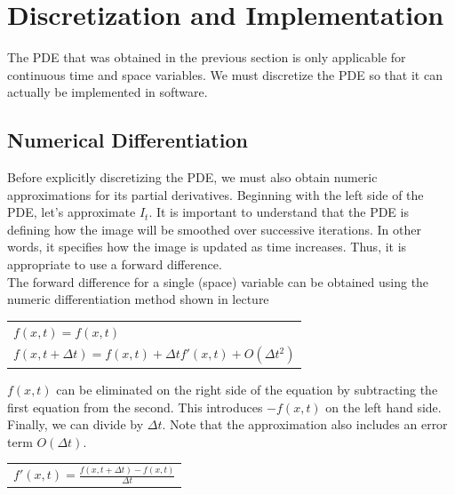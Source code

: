 \documentclass{article}
\begin{document}
  \newpage
  \section{Discretization and Implementation}
  \noindent
  The PDE that was obtained in the previous section is only applicable for continuous
  time and space variables. We must discretize the PDE so that it can actually be implemented in software.\\

  \subsection{Numerical Differentiation}
  \noindent
  Before explicitly discretizing the PDE, we must also obtain numeric approximations for its partial
  derivatives. Beginning with the left side of the PDE, let's approximate $I_{t}$. 
  It is important to understand that the PDE is defining how the image will be smoothed
  over successive iterations. In other words, it specifies how the image is updated as time increases.
  Thus, it is appropriate to use a forward difference.\\

  \noindent
  The forward difference for a single (space) variable can be obtained using the 
  numeric differentiation method shown in lecture
  \begin{center}
    \begin{tabular}{l}
      \vspace{12pt}
      $f(x,t) = f(x,t)$\\
      $f(x,t+\Delta t) = f(x,t) + \Delta t f'(x,t) + O(\Delta t^2)$\\
    \end{tabular}
  \end{center}

  \noindent
  $f(x,t)$ can be eliminated on the right side of the equation by subtracting the 
  first equation from the second. This introduces $-f(x,t)$ on the left hand side.
  Finally, we can divide by $\Delta t$.
  Note that the approximation also includes an error term $O(\Delta t)$.
  \begin{center}
    \begin{tabular}{l}
      $f'(x,t) = \frac{f(x,t+\Delta t) - f(x,t)}{\Delta t}$\\
    \end{tabular}
  \end{center}
\end{document}
